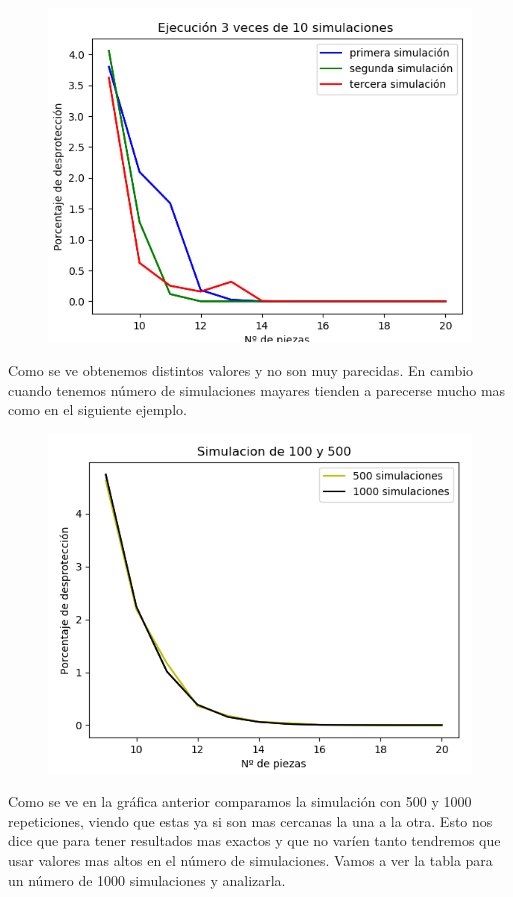 \documentclass[]{article}
\begin{document}
\begin{figure}[H]
	\centering
	\includegraphics[width=1\linewidth]{img/screenshot0016}
	\label{fig:screenshot0016}
\end{figure}

Como se ve obtenemos distintos valores y no son muy parecidas. En cambio cuando tenemos número de simulaciones mayares tienden a parecerse mucho mas como en el siguiente ejemplo.

\begin{figure}[H]
	\centering
	\includegraphics[width=1\linewidth]{img/screenshot0017}
	\label{fig:screenshot0017}
\end{figure}
Como se ve en la gráfica anterior comparamos la simulación con 500 y 1000 repeticiones, viendo que estas ya si son mas cercanas la una a la otra. Esto nos dice que para tener resultados mas exactos y que no varíen tanto tendremos que usar valores mas altos en el número de simulaciones. Vamos a ver la tabla para un número de 1000 simulaciones y analizarla.
\end{document}
